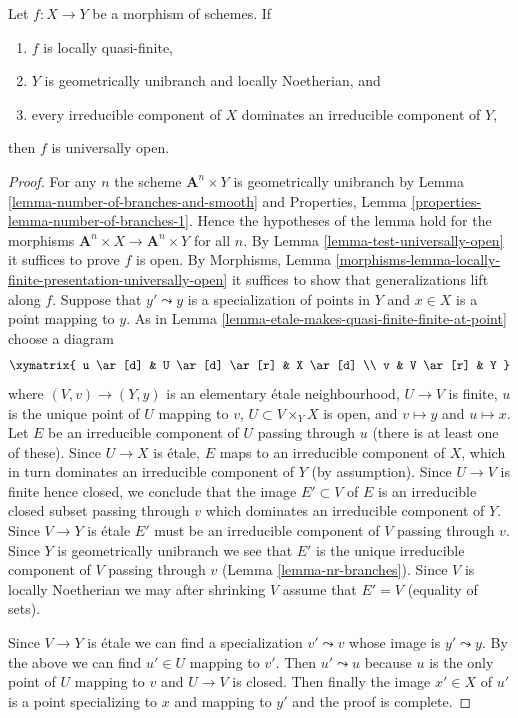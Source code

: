 \begin{lemma}
\label{lemma-quasi-finite-Noetherian-universally-open}
Let $f : X \to Y$ be a morphism of schemes. If
\begin{enumerate}
\item $f$ is locally quasi-finite,
\item $Y$ is geometrically unibranch and locally Noetherian, and
\item every irreducible component of $X$ dominates
an irreducible component of $Y$,
\end{enumerate}
then $f$ is universally open.
\end{lemma}

\begin{proof}
For any $n$ the scheme $\mathbf{A}^n \times Y$ is geometrically unibranch
by Lemma \ref{lemma-number-of-branches-and-smooth} and
Properties, Lemma \ref{properties-lemma-number-of-branches-1}. Hence
the hypotheses of the lemma hold for the morphisms
$\mathbf{A}^n \times X \to \mathbf{A}^n \times Y$ for all $n$.
By Lemma \ref{lemma-test-universally-open}
it suffices to prove $f$ is open. By Morphisms, Lemma
\ref{morphisms-lemma-locally-finite-presentation-universally-open}
it suffices to show that generalizations lift along $f$.
Suppose that $y' \leadsto y$ is a specialization of points in
$Y$ and $x \in X$ is a point mapping to $y$.
As in Lemma \ref{lemma-etale-makes-quasi-finite-finite-at-point}
choose a diagram
$$
\xymatrix{
u \ar[d] & U \ar[d] \ar[r] & X \ar[d] \\
v & V \ar[r] & Y
}
$$
where $(V, v) \to (Y, y)$ is an elementary \'etale neighbourhood,
$U \to V$ is finite, $u$ is the unique point of $U$ mapping to $v$,
$U \subset V \times_Y X$ is open, and $v \mapsto y$ and $u \mapsto x$.
Let $E$ be an irreducible component of $U$ passing through $u$
(there is at least one of these). Since $U \to X$ is \'etale, $E$
maps to an irreducible component of $X$,
which in turn dominates an irreducible component of $Y$ (by assumption).
Since $U \to V$ is finite hence closed, we conclude that
the image $E' \subset V$ of $E$ is an irreducible closed subset
passing through $v$ which dominates an irreducible component of $Y$.
Since $V \to Y$ is \'etale $E'$ must be an irreducible component
of $V$ passing through $v$.
Since $Y$ is geometrically unibranch we see that $E'$ is the unique irreducible
component of $V$ passing through $v$ (Lemma \ref{lemma-nr-branches}).
Since $V$ is locally Noetherian we may after shrinking $V$
assume that $E' = V$ (equality of sets).

\medskip\noindent
Since $V \to Y$ is \'etale we can find a specialization
$v' \leadsto v$ whose image is $y' \leadsto y$.
By the above we can find $u' \in U$ mapping to $v'$.
Then $u' \leadsto u$ because $u$ is the only point of
$U$ mapping to $v$ and $U \to V$ is closed.
Then finally the image $x' \in X$ of $u'$ is a point
specializing to $x$ and mapping to $y'$ and the proof is complete.
\end{proof}
